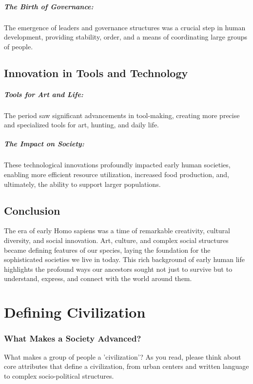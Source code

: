 \documentclass[a4paper,12pt]{book}
\begin{document}
\paragraph{The Birth of Governance:}
The emergence of leaders and governance structures was a crucial step in human development, providing stability, order, and a means of coordinating large groups of people.

\section*{Innovation in Tools and Technology}

\paragraph{Tools for Art and Life:}
The period saw significant advancements in tool-making, creating more precise and specialized tools for art, hunting, and daily life.

\paragraph{The Impact on Society:}
These technological innovations profoundly impacted early human societies, enabling more efficient resource utilization, increased food production, and, ultimately, the ability to support larger populations.

\section*{Conclusion}

The era of early Homo sapiens was a time of remarkable creativity, cultural diversity, and social innovation. Art, culture, and complex social structures became defining features of our species, laying the foundation for the sophisticated societies we live in today. This rich background of early human life highlights the profound ways our ancestors sought not just to survive but to understand, express, and connect with the world around them.

\chapter{Defining Civilization}
\subsection*{What Makes a Society Advanced?}
What makes a group of people a 'civilization'? As you read, please think about core attributes that define a civilization, from urban centers and written language to complex socio-political structures.
\end{document}
